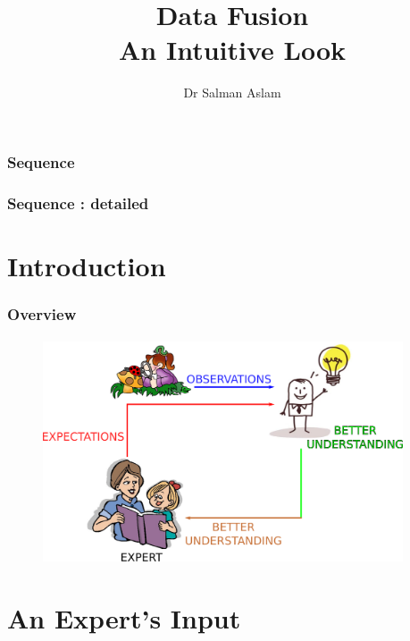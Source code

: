 

\title{Data Fusion\\
An Intuitive Look}  
\author{Dr Salman Aslam}
\date{} 




\begin{frame}[plain]\pw\Large
\vspace{0.8in}
\titlepage
\end{frame}

\begin{frame}[plain]\pw\Large
\frametitle{\textbf{Sequence}}
\setcounter{tocdepth}{1}
\tableofcontents
\end{frame} 

\begin{frame}[plain]\pw\Large
\frametitle{\textbf{Sequence : detailed}}
\setcounter{tocdepth}{2}
\tableofcontents%
\end{frame} 

\section{Introduction}
\begin{frame}\pw\Large
\frametitle{Overview}
\framesubtitle{}
\begin{figure}
\includegraphics[width=0.95\textwidth]{figs/WFAR11_UCP_Update_Prediction_BlockDiagram.pdf}
\end{figure}
\end{frame}


\section{An Expert's Input}
\begin{frame}\pw\Large
\frametitle{}
\framesubtitle{}
\end{frame}


